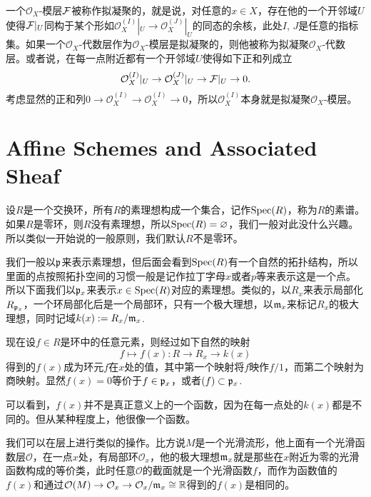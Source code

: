 \para 一个$\mathcal{O}_X$-模层$\mathcal{F}$被称作拟凝聚的，就是说，对任意的$x\in X$，存在他的一个开邻域$U$使得$\mathcal{F}|_U$同构于某个形如$\mathcal{O}_X^{(I)}|_U\to \mathcal{O}_X^{(J)}|_U$的同态的余核，此处$I$, $J$是任意的指标集。如果一个$\mathcal{O}_X$-代数层作为$\mathcal{O}_X$-模层是拟凝聚的，则他被称为拟凝聚$\mathcal{O}_X$-代数层。或者说，在每一点附近都有一个开邻域$U$使得如下正和列成立
\[
	\mathcal{O}_X^{(I)}|_U\to \mathcal{O}_X^{(J)}|_U\to \mathcal{F}|_U\to 0.
\]
考虑显然的正和列$0\to \mathcal{O}_X^{(I)}\to \mathcal{O}_X^{(I)} \to 0$，所以$\mathcal{O}_X^{(I)}$本身就是拟凝聚$\mathcal{O}_X$-模层。


\section{Affine Schemes and Associated Sheaf}

\para 设$R$是一个交换环，所有$R$的素理想构成一个集合，记作$\operatorname{Spec}(R)$，称为$R$的素谱。如果$R$是零环，则$R$没有素理想，所以$\operatorname{Spec}(R)=\varnothing$，我们一般对此没什么兴趣。所以类似一开始说的一般原则，我们默认$R$不是零环。

我们一般以$\mathfrak{p}$来表示素理想，但后面会看到$\operatorname{Spec}(R)$有一个自然的拓扑结构，所以里面的点按照拓扑空间的习惯一般是记作拉丁字母$x$或者$p$等来表示这是一个点。所以下面我们以$\mathfrak{p}_x$来表示$x\in \operatorname{Spec}(R)$对应的素理想。类似的，以$R_x$来表示局部化$R_{\mathfrak{p}_x}$，一个环局部化后是一个局部环，只有一个极大理想，以$\mathfrak{m}_x$来标记$R_x$的极大理想，同时记域$k(x):=R_x/\mathfrak{m}_x$.

\para 现在设$f\in R$是环中的任意元素，则经过如下自然的映射
\[
	f\mapsto f(x):R\to R_x\to k(x)
\]
得到的$f(x)$成为环元$f$在$x$处的值，其中第一个映射将$f$映作$f/1$，而第二个映射为商映射。显然$f(x)=0$等价于$f\in \mathfrak{p}_x$，或者$(f)\subset \mathfrak{p}_x$.

可以看到，$f(x)$并不是真正意义上的一个函数，因为在每一点处的$k(x)$都是不同的。但从某种程度上，他很像一个函数。

我们可以在层上进行类似的操作。比方说$M$是一个光滑流形，他上面有一个光滑函数层$\mathcal{O}$，在一点$x$处，有局部环$\mathcal{O}_x$，他的极大理想$\mathfrak{m}_x$就是那些在$x$附近为零的光滑函数构成的等价类，此时任意$\mathcal{O}$的截面就是一个光滑函数$f$，而作为函数值的$f(x)$和通过$\mathcal{O}(M)\to \mathcal{O}_x\to \mathcal{O}_x/\mathfrak{m}_x\cong \mathbb{R}$得到的$f(x)$是相同的。

